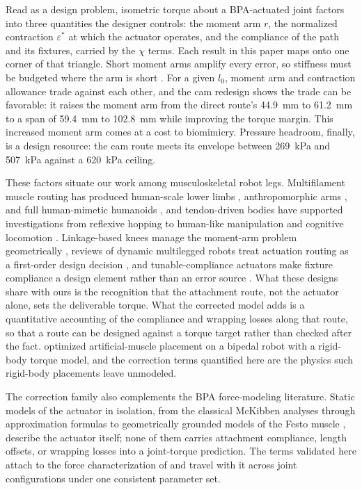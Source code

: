 \documentclass[utf8]{FrontiersinHarvard} %
\begin{document}
Read as a design problem, isometric torque about a BPA-actuated joint factors into three quantities the designer controls: the moment arm $r$, the normalized contraction $\varepsilon^{*}$ at which the actuator operates, and the compliance of the path and its fixtures, carried by the $\chi$ terms. Each result in this paper maps onto one corner of that triangle. Short moment arms amplify every error, so stiffness must be budgeted where the arm is short \citep{young_analyzing_2019}. For a given $l_{0}$, moment arm and contraction allowance trade against each other, and the cam redesign shows the trade can be favorable: it raises the moment arm from the direct route's \qty{44.9}{\mm} to \qty{61.2}{\mm} to a span of \qty{59.4}{\mm} to \qty{102.8}{\mm} while improving the torque margin. This increased moment arm comes at a cost to biomimicry.  Pressure headroom, finally, is a design resource: the cam route meets its envelope between \qty{269}{\kPa} and \qty{507}{\kPa} against a \qty{620}{\kPa} ceiling.

These factors situate our work among musculoskeletal robot legs. Multifilament muscle routing has produced human-scale lower limbs \citep{kurumaya_musculoskeletal_2016}, anthropomorphic arms \citep{hitzmann_anthropomorphic_2018}, and full human-mimetic humanoids \citep{asano_musculoskeletal_2019}, and tendon-driven bodies have supported investigations from reflexive hopping \citep{liu_robotic_2018} to human-like manipulation \citep{chen_realizing_2019} and cognitive locomotion \citep{schilling_adaptive_2022}. Linkage-based knees manage the moment-arm problem geometrically \citep{romero_four-bar_2020}, reviews of dynamic multilegged robots treat actuation routing as a first-order design decision \citep{he_mechanism_2020}, and tunable-compliance actuators make fixture compliance a design element rather than an error source \citep{leibach_development_2020}. What these designs share with ours is the recognition that the attachment route, not the actuator alone, sets the deliverable torque. What the corrected model adds is a quantitative accounting of the compliance and wrapping losses along that route, so that a route can be designed against a torque target rather than checked after the fact. \citet{morrow_optimization_2020} optimized artificial-muscle placement on a bipedal robot with a rigid-body torque model, and the correction terms quantified here are the physics such rigid-body placements leave unmodeled.

The correction family also complements the BPA force-modeling literature. Static models of the actuator in isolation, from the classical McKibben analyses \citep{chou_measurement_1996} through approximation formulas \citep{sarosi_new_2012} to geometrically grounded models of the Festo muscle \citep{martens_modeling_2017, tondu_static_2022}, describe the actuator itself; none of them carries attachment compliance, length offsets, or wrapping losses into a joint-torque prediction. The terms validated here attach to the force characterization of \citet{bolen_2026} and travel with it across joint configurations under one consistent parameter set.
\end{document}
